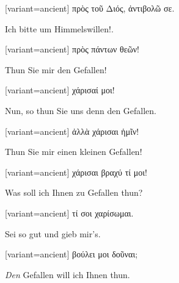 \begin{greek}[variant=ancient]%
πρὸς τοῦ Διός, ἀντιβολῶ σε.

\end{greek}%
\switchcolumn*

Ich bitte um Himmels\textcompwordmark{}willen!.

\switchcolumn

\begin{greek}[variant=ancient]%
πρὸς πάντων θεῶν!

\end{greek}%
\switchcolumn*

Thun Sie mir den Gefallen!

\switchcolumn

\begin{greek}[variant=ancient]%
χάρισαί μοι!

\end{greek}%
\switchcolumn*

Nun, so thun Sie uns denn den Gefallen.

\switchcolumn

\begin{greek}[variant=ancient]%
ἀλλὰ χάρισαι ἡμῖν!

\end{greek}%
\switchcolumn*

Thun Sie mir einen kleinen Gefallen!

\switchcolumn

\begin{greek}[variant=ancient]%
χάρισαι βραχύ τί μοι!

\end{greek}%
\switchcolumn*

Was soll ich Ihnen zu Gefallen thun?

\switchcolumn

\begin{greek}[variant=ancient]%
τί σοι χαρίσωμαι.

\end{greek}%
\switchcolumn*

Sei so gut und gieb mir's.

\switchcolumn

\begin{greek}[variant=ancient]%
βούλει μοι δοῦναι;

\end{greek}%
\switchcolumn*

\emph{Den} Gefallen will ich Ihnen thun.

\switchcolumn

